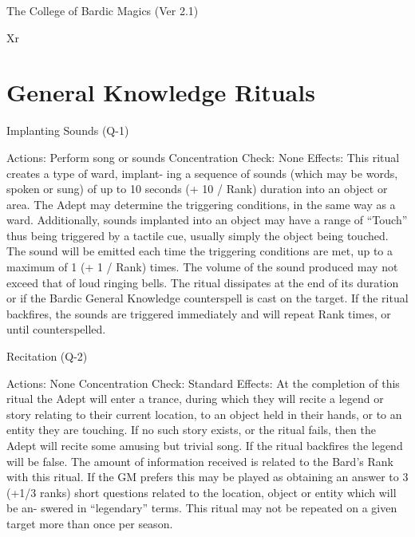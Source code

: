 \begin{Chapter}{The College of Bardic Magics (Ver 2.1)}
\begin{tarularx}{\columnwidth}{Xr}
\section{General Knowledge Rituals}

Implanting Sounds (Q-1) 


Actions: Perform song or sounds 
Concentration Check: None 
Effects: This ritual creates a type of ward, implant-
ing  a  sequence  of  sounds  (which  may  be  words, 
spoken or sung) of up to 10 seconds (+ 10 / Rank) 
duration  into  an  object  or  area.  The  Adept  may 
determine  the  triggering  conditions,  in  the  same 
way as a ward. Additionally, sounds implanted into 
an object may have a range of “Touch” thus being 
triggered by a tactile cue, usually simply the object 
being  touched.  The  sound  will  be  emitted  each 
time  the  triggering  conditions  are  met,  up  to  a 
maximum of 1 (+ 1 / Rank) times. The volume of 
the  sound  produced  may  not  exceed  that  of  loud 
ringing bells. The ritual dissipates at the end of its 
duration or if the Bardic General Knowledge counterspell is cast on the target. If the ritual backfires, 
the  sounds  are  triggered  immediately  and  will 
repeat Rank times, or until counterspelled. 

Recitation (Q-2) 

Actions: None 
Concentration Check: Standard 
Effects:  At  the  completion  of  this  ritual  the  Adept 
will enter a trance, during which they  will recite a 
legend or story relating to their current location, to 
an  object  held  in  their  hands,  or  to  an  entity  they 
are  touching.  If  no  such  story  exists,  or  the  ritual 
fails,  then  the  Adept  will  recite  some  amusing but 
trivial  song.  If  the  ritual  backfires  the  legend  will 
be  false.  The  amount  of  information  received  is 
related  to  the  Bard’s  Rank  with  this  ritual.  If  the 
GM  prefers  this  may  be  played  as  obtaining  an 
answer to 3 (+1/3 ranks) short questions related to 
the  location,  object  or  entity  which  will  be  an-
swered  in  “legendary”  terms.  This  ritual  may  not 
be  repeated  on  a  given  target  more  than  once  per 
season. 


\end{tarularx}
\end{Chapter}
